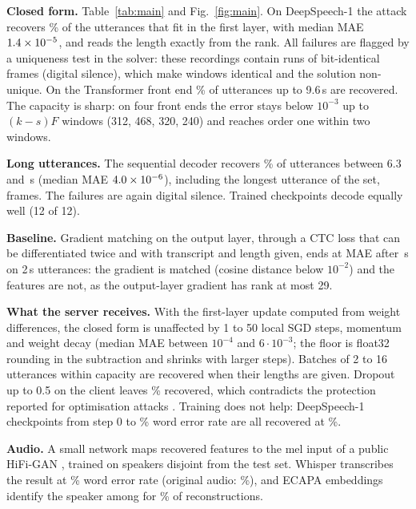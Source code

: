 \documentclass[a4paper]{esannV2}
\begin{document}
\textbf{Closed form.} Table~\ref{tab:main} and Fig.~\ref{fig:main}. On DeepSpeech-1 the attack recovers
\DSshortSucc\% of the \DSshortN{} utterances that fit in the first layer, with median MAE
$1.4\times 10^{-5}$, and reads the length exactly from the rank. All \DSshortFail{} failures are flagged by a
uniqueness test in the solver: these recordings contain runs of bit-identical frames (digital silence),
which make windows identical and the solution non-unique. On the Transformer front end \TFSucc\% of
\TFN{} utterances up to 9.6\,s are recovered. The capacity is sharp: on four front ends the error stays
below $10^{-3}$ up to $(k-s)F$ windows (312, 468, 320, 240) and reaches order one within two windows.

\textbf{Long utterances.} The sequential decoder recovers \DSlongSucc\% of \DSlongN{} utterances
between 6.3 and \DSlongMaxAudio\,s (median MAE $4.0\times 10^{-6}$), including the longest utterance of the
set, \DSlongestFrames{} frames. The failures are again digital silence. Trained checkpoints decode equally well (12 of 12).

\textbf{Baseline.} Gradient matching on the output layer, through a CTC loss that can be differentiated
twice and with transcript and length given, ends at MAE \GMmae{} after \GMsec\,s on 2\,s utterances: the gradient is
matched (cosine distance below $10^{-2}$) and the features are not, as the output-layer gradient has
rank at most 29.

\textbf{What the server receives.} With the first-layer update computed from weight differences, the
closed form is unaffected by 1 to 50 local SGD steps, momentum and weight decay (median MAE between
$10^{-4}$ and $6\cdot10^{-3}$; the floor is float32 rounding in the subtraction and shrinks with larger
steps). Batches of 2 to 16 utterances within capacity are recovered when their lengths are given.
Dropout up to 0.5 on the client leaves \DropAllSucc\% recovered, which contradicts the protection
reported for optimisation attacks \cite{dang2022speaker}. Training does not help: DeepSpeech-1
checkpoints from step 0 to \TrDSwer\% word error rate are all recovered at \TrDSsucc\%.

\textbf{Audio.} A small network maps recovered features to the mel input of a public HiFi-GAN
\cite{kong2020hifigan}, trained on speakers disjoint from the test set. Whisper \cite{radford2023robust}
transcribes the result at \WerShort\% word error rate (original audio: \WerOrigShort\%), and ECAPA
embeddings \cite{desplanques2020ecapa} identify the speaker among \Speakers{} for \SpkShort\% of
reconstructions.
\end{document}
